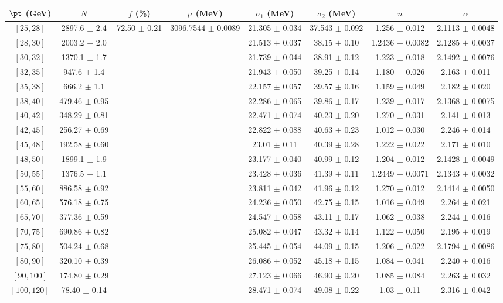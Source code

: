 \begin{tabular}{c||c|c|c|c|c|c|c}
$\pt$ (GeV) & $N$ & $f$ (\%) & $\mu$ (MeV) & $\sigma_1$ (MeV) & $\sigma_2$ (MeV) & $n$ & $\alpha$ \\
\hline
$[25, 28]$ & 2897.6 $\pm$ 2.4 & \multirow{19}{*}{72.50 $\pm$ 0.21} & \multirow{19}{*}{3096.7544 $\pm$ 0.0089} & 21.305 $\pm$ 0.034 & 37.543 $\pm$ 0.092 & 1.256 $\pm$ 0.012 & 2.1113 $\pm$ 0.0048\\
$[28, 30]$ & 2003.2 $\pm$ 2.0 &  &  & 21.513 $\pm$ 0.037 & 38.15 $\pm$ 0.10 & 1.2436 $\pm$ 0.0082 & 2.1285 $\pm$ 0.0037\\
$[30, 32]$ & 1370.1 $\pm$ 1.7 &  &  & 21.739 $\pm$ 0.044 & 38.91 $\pm$ 0.12 & 1.223 $\pm$ 0.018 & 2.1492 $\pm$ 0.0076\\
$[32, 35]$ & 947.6 $\pm$ 1.4 &  &  & 21.943 $\pm$ 0.050 & 39.25 $\pm$ 0.14 & 1.180 $\pm$ 0.026 & 2.163 $\pm$ 0.011\\
$[35, 38]$ & 666.2 $\pm$ 1.1 &  &  & 22.157 $\pm$ 0.057 & 39.57 $\pm$ 0.16 & 1.159 $\pm$ 0.049 & 2.182 $\pm$ 0.020\\
$[38, 40]$ & 479.46 $\pm$ 0.95 &  &  & 22.286 $\pm$ 0.065 & 39.86 $\pm$ 0.17 & 1.239 $\pm$ 0.017 & 2.1368 $\pm$ 0.0075\\
$[40, 42]$ & 348.29 $\pm$ 0.81 &  &  & 22.471 $\pm$ 0.074 & 40.23 $\pm$ 0.20 & 1.270 $\pm$ 0.031 & 2.141 $\pm$ 0.013\\
$[42, 45]$ & 256.27 $\pm$ 0.69 &  &  & 22.822 $\pm$ 0.088 & 40.63 $\pm$ 0.23 & 1.012 $\pm$ 0.030 & 2.246 $\pm$ 0.014\\
$[45, 48]$ & 192.58 $\pm$ 0.60 &  &  & 23.01 $\pm$ 0.11 & 40.39 $\pm$ 0.28 & 1.222 $\pm$ 0.022 & 2.171 $\pm$ 0.010\\
$[48, 50]$ & 1899.1 $\pm$ 1.9 &  &  & 23.177 $\pm$ 0.040 & 40.99 $\pm$ 0.12 & 1.204 $\pm$ 0.012 & 2.1428 $\pm$ 0.0049\\
$[50, 55]$ & 1376.5 $\pm$ 1.1 &  &  & 23.428 $\pm$ 0.036 & 41.39 $\pm$ 0.11 & 1.2449 $\pm$ 0.0071 & 2.1343 $\pm$ 0.0032\\
$[55, 60]$ & 886.58 $\pm$ 0.92 &  &  & 23.811 $\pm$ 0.042 & 41.96 $\pm$ 0.12 & 1.270 $\pm$ 0.012 & 2.1414 $\pm$ 0.0050\\
$[60, 65]$ & 576.18 $\pm$ 0.75 &  &  & 24.236 $\pm$ 0.050 & 42.75 $\pm$ 0.15 & 1.016 $\pm$ 0.049 & 2.264 $\pm$ 0.021\\
$[65, 70]$ & 377.36 $\pm$ 0.59 &  &  & 24.547 $\pm$ 0.058 & 43.11 $\pm$ 0.17 & 1.062 $\pm$ 0.038 & 2.244 $\pm$ 0.016\\
$[70, 75]$ & 690.86 $\pm$ 0.82 &  &  & 25.082 $\pm$ 0.047 & 43.32 $\pm$ 0.14 & 1.122 $\pm$ 0.050 & 2.195 $\pm$ 0.019\\
$[75, 80]$ & 504.24 $\pm$ 0.68 &  &  & 25.445 $\pm$ 0.054 & 44.09 $\pm$ 0.15 & 1.206 $\pm$ 0.022 & 2.1794 $\pm$ 0.0086\\
$[80, 90]$ & 320.10 $\pm$ 0.39 &  &  & 26.086 $\pm$ 0.052 & 45.18 $\pm$ 0.15 & 1.084 $\pm$ 0.041 & 2.240 $\pm$ 0.016\\
$[90, 100]$ & 174.80 $\pm$ 0.29 &  &  & 27.123 $\pm$ 0.066 & 46.90 $\pm$ 0.20 & 1.085 $\pm$ 0.084 & 2.263 $\pm$ 0.032\\
$[100, 120]$ & 78.40 $\pm$ 0.14 &  &  & 28.471 $\pm$ 0.074 & 49.08 $\pm$ 0.22 & 1.03 $\pm$ 0.11 & 2.316 $\pm$ 0.042\\
\end{tabular}
